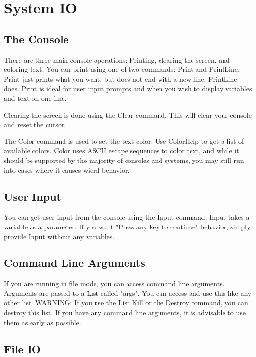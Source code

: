 \documentclass{report}
\begin{document}
\chapter{System IO}

\section{The Console}

There are three main console operations: Printing, clearing the screen, and coloring text. You can print using one of two commands: Print and PrintLine. Print just prints what you want, but does not end with a new line. PrintLine does. Print is ideal for user input prompts and when you wish to display variables and text on one line.

Clearing the screen is done using the Clear command. This will clear your console and reset the cursor.

The Color command is used to set the text color. Use ColorHelp to get a list of available colors. Color uses ASCII escape sequences to color text, and while it should be supported by the majority of consoles and systems, you may still run into cases where it causes wierd behavior.

\section{User Input}

You can get user input from the console using the Input command. Input takes a variable as a parameter. If you want "Press any key to continue" behavior, simply provide Input without any variables.

\section{Command Line Arguments}

If you are running in file mode, you can access command line arguments. Arguments are passed to a List called "args". You can access and use this like any other list.
WARNING: If you use the List Kill or the Destroy command, you can destroy this list. If you have any command line arguments, it is advisable to use them as early as possible.

\section{File IO}
\end{document}
